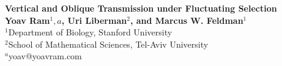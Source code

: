 \documentclass[a0,landscape]{a0poster}
\begin{document}


\begin{minipage}[b]{1\linewidth}
\veryHuge \color{NavyBlue} \textbf{Vertical and Oblique Transmission under Fluctuating Selection} \color{Black}\\ %
\huge \textbf{Yoav Ram$^1,a$, Uri Liberman$^{2}$, and Marcus W. Feldman$^1$}\\ %
\huge $^1$Department of Biology, Stanford University\\ %
\huge $^{2}$School of Mathematical Sciences, Tel-Aviv University\\ %
\huge $^{a}$yoav@yoavram.com\\ %
\end{minipage}
%

\vspace{1cm} %

\end{document}
